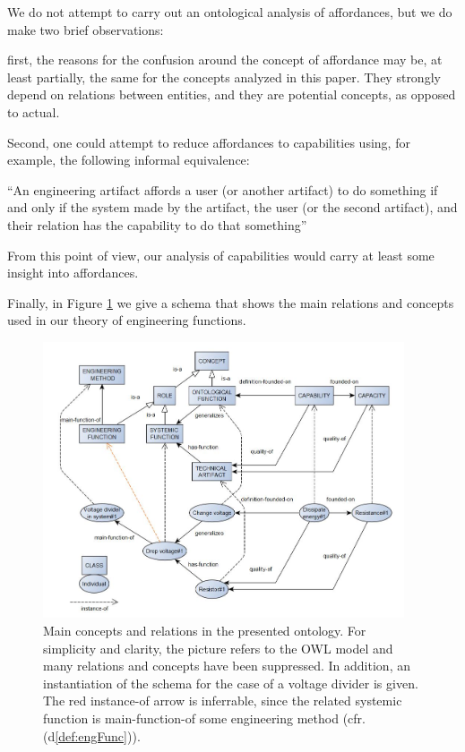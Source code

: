 \documentclass[sw]{iosart2x}
\newcommand{\bflist}{\begin{list}{}{\setlength{\topsep}{2mm}\setlength{\partopsep}{0mm}\setlength{\parsep}{0mm}\setlength{\leftmargin}{9mm}\setlength{\labelwidth}{8mm}}}
\newcommand{\eflist}{\end{list}}
\newcommand{\DefLabel}{\textrm{d}}
\newcommand{\ExLabel}{\textrm{ex}}
\newcommand{\myex}[1]{\refstepcounter{cntex}\begin{small}{\bf \ExLabel\thecntex\label{ex:#1}}\end{small}}
\newcounter{cntex}
\newcommand{\mytext}[1]{``#1''}
\newcommand{\refdf}[1]{({\DefLabel}\ref{#1})}
\begin{document}
We do not attempt to carry out an ontological analysis of affordances, but we do make two brief observations:
\begin{itemize}
  \item first, the reasons for the confusion around the concept of affordance may be, at least partially, the same for the concepts analyzed in this paper. They strongly depend on relations between entities, and they are potential concepts, as opposed to actual.
  \item Second, one could attempt to reduce affordances to capabilities using, for example, the following informal equivalence:
  \bflist
    \item[\myex{affordances}] \mytext{An engineering artifact affords a user (or another artifact) to do something if and only if the system made by the artifact, the user (or the second artifact), and their relation has the capability to do that something}
  \eflist 
\end{itemize}
From this point of view, our analysis of capabilities would carry at least some insight into affordances.

Finally, in Figure \ref{fig:model} we give a schema that shows the main relations and concepts used in our theory of engineering functions.\marginpar{\color{red}{ho spostato qui la fig.}}

\begin{figure}
    \centering
    \includegraphics[width=0.95\textwidth]{schema-manuale.JPG}
    \caption{Main concepts and relations in the presented ontology. For simplicity and clarity, the picture refers to the OWL model and many relations and concepts have been suppressed. In addition, an instantiation of the schema for the case of a voltage divider is given. The red instance-of arrow is inferrable, since the related systemic function is main-function-of some engineering method (cfr. \refdf{def:engFunc}).}
    \label{fig:model}
\end{figure}
\end{document}
